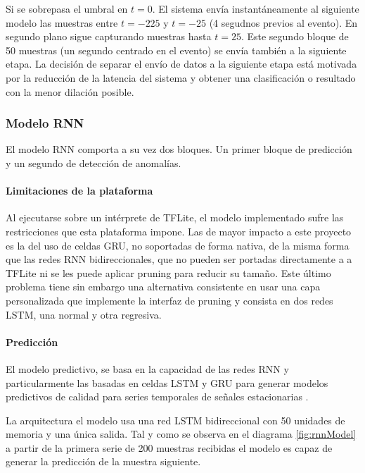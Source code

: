 \documentclass[../tfm.tex]{subfiles}
\begin{document}
Si se sobrepasa el umbral en $t=0$. El sistema envía instantáneamente al siguiente modelo las muestras entre $t=-225$ y $t=-25$ (4 segudnos previos al evento). En segundo plano sigue capturando muestras hasta $t=25$. Este segundo bloque de 50 muestras (un segundo centrado en el evento) se envía también a la siguiente etapa. La decisión de separar el envío de datos a la siguiente etapa está motivada por la reducción de la latencia del sistema y obtener una clasificación o resultado con la menor dilación posible.


\subsubsection{Modelo RNN}

El modelo RNN comporta a su vez dos bloques. Un primer bloque de predicción y un segundo de detección de anomalías.

\paragraph{Limitaciones de la plataforma}
Al ejecutarse sobre un intérprete de TFLite, el modelo implementado sufre las restricciones que esta plataforma impone. Las de mayor impacto a este proyecto es la del uso de celdas GRU, no soportadas de forma nativa\cite{tfliteGru}, de la misma forma que las redes RNN bidireccionales, que no pueden ser portadas directamente a a TFLite\cite{tfliteBidir} ni se les puede aplicar pruning para reducir su tamaño\cite{tfPruneBidir}. Este último problema tiene sin embargo una alternativa consistente en usar una capa personalizada que implemente la interfaz de pruning y consista en dos redes LSTM, una normal y otra regresiva.


\paragraph*{Predicción}


El modelo predictivo, se basa en la capacidad de las redes RNN y particularmente las basadas en celdas LSTM y GRU para generar modelos predictivos de calidad para series temporales de señales estacionarias \cite{Qin2019}.

La arquitectura el modelo usa una red LSTM bidireccional con 50 unidades de memoria y una única salida. Tal y como se observa en el diagrama \ref{fig:rnnModel} a partir de la primera serie de 200 muestras recibidas el modelo es capaz de generar la predicción de la muestra siguiente.
\end{document}
